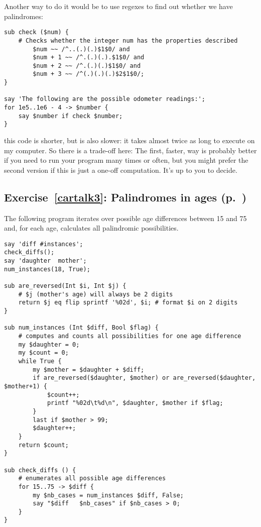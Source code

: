 Another way to do it would be to use regexes to find out whether 
we have palindromes:

\begin{verbatim}
sub check ($num) {
    # Checks whether the integer num has the properties described
        $num ~~ /^..(.)(.)$1$0/ and 
        $num + 1 ~~ /^.(.)(.).$1$0/ and 
        $num + 2 ~~ /^.(.)(.)$1$0/ and 
        $num + 3 ~~ /^(.)(.)(.)$2$1$0/;
}

say 'The following are the possible odometer readings:';
for 1e5..1e6 - 4 -> $number {
    say $number if check $number;
}
\end{verbatim}

this code is shorter, but is also slower: it takes almost twice 
as long to execute on my computer. So there is a trade-off here: 
The first, faster, way is probably better if you need to run 
your program many times or often, but you might prefer the second 
version if this is just a one-off computation. It's up to you to 
decide.


\subsection{Exercise~\ref{cartalk3}: Palindromes in ages (p.~\pageref{cartalk3})}
\label{sol_cartalk3}

The following program iterates over possible age differences 
between 15 and 75 and, for each age, calculates all 
palindromic possibilities.

\begin{verbatim}
say 'diff #instances';
check_diffs();
say 'daughter  mother';
num_instances(18, True);

sub are_reversed(Int $i, Int $j) {
    # $j (mother's age) will always be 2 digits
    return $j eq flip sprintf '%02d', $i; # format $i on 2 digits
}

sub num_instances (Int $diff, Bool $flag) {
    # computes and counts all possibilities for one age difference
    my $daughter = 0;
    my $count = 0;
    while True {
        my $mother = $daughter + $diff;
        if are_reversed($daughter, $mother) or are_reversed($daughter, $mother+1) {
            $count++;
            printf "%02d\t%d\n", $daughter, $mother if $flag;
        }
        last if $mother > 99;
        $daughter++;
    }
    return $count;
}

sub check_diffs () {
    # enumerates all possible age differences
    for 15..75 -> $diff {
        my $nb_cases = num_instances $diff, False;
        say "$diff   $nb_cases" if $nb_cases > 0;
    }
}
\end{verbatim}

